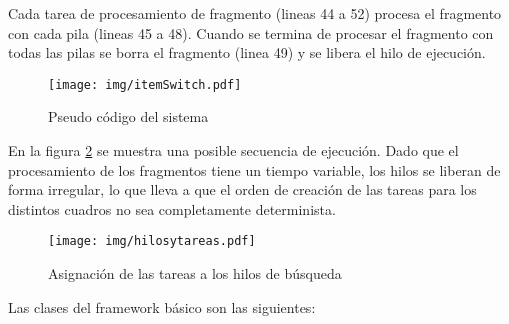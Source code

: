 Cada tarea de procesamiento de fragmento (lineas 44 a 52) procesa el fragmento
con cada pila (lineas 45 a 48). Cuando se termina de procesar el fragmento con
todas las pilas se borra el fragmento (linea 49) y se libera el hilo de
ejecución.

\begin{figure}[h]

	\centering

	\texttt{[image: img/itemSwitch.pdf]}

	\caption{Pseudo código del sistema}

	\label{codigo}

\end{figure}

En la figura \ref{hilosytareas} se muestra una posible secuencia de ejecución.
Dado que el procesamiento de los fragmentos tiene un tiempo variable, los hilos
se liberan de forma irregular, lo que lleva a que el orden de creación de las
tareas para los distintos cuadros no sea completamente determinista.

\begin{figure}[h]

	\texttt{[image: img/hilosytareas.pdf]}

	\caption{Asignación de las tareas a los hilos de búsqueda}

	\label{hilosytareas}

\end{figure}

Las clases del framework básico son las siguientes:

